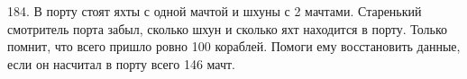 184. В порту стоят яхты с одной мачтой и шхуны с 2 мачтами. Старенький смотритель порта забыл, сколько шхун и сколько яхт находится в порту. Только помнит, что всего пришло ровно 100 кораблей. Помоги ему восстановить данные, если он насчитал в порту всего 146 мачт.\\
